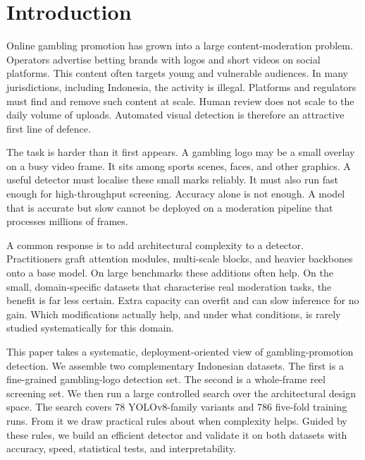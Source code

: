 \documentclass[preprint,review,12pt]{elsarticle}
\begin{document}
\section{Introduction}
Online gambling promotion has grown into a large content-moderation problem.
Operators advertise betting brands with logos and short videos on social
platforms. This content often targets young and vulnerable audiences. In many
jurisdictions, including Indonesia, the activity is illegal. Platforms and
regulators must find and remove such content at scale. Human review does not
scale to the daily volume of uploads. Automated visual detection is therefore an
attractive first line of defence.

The task is harder than it first appears. A gambling logo may be a small overlay
on a busy video frame. It sits among sports scenes, faces, and other graphics. A
useful detector must localise these small marks reliably. It must also run fast
enough for high-throughput screening. Accuracy alone is not enough. A model that
is accurate but slow cannot be deployed on a moderation pipeline that processes
millions of frames.

A common response is to add architectural complexity to a detector. Practitioners
graft attention modules, multi-scale blocks, and heavier backbones onto a base
model. On large benchmarks these additions often help. On the small,
domain-specific datasets that characterise real moderation tasks, the benefit is
far less certain. Extra capacity can overfit and can slow inference for no gain.
Which modifications actually help, and under what conditions, is rarely studied
systematically for this domain.

This paper takes a systematic, deployment-oriented view of gambling-promotion
detection. We assemble two complementary Indonesian datasets. The first is a
fine-grained gambling-logo detection set. The second is a whole-frame reel
screening set. We then run a large controlled search over the architectural
design space. The search covers 78 YOLOv8-family variants and 786 five-fold
training runs. From it we draw practical rules about when complexity helps.
Guided by these rules, we build an efficient detector and validate it on both
datasets with accuracy, speed, statistical tests, and interpretability.
\end{document}
